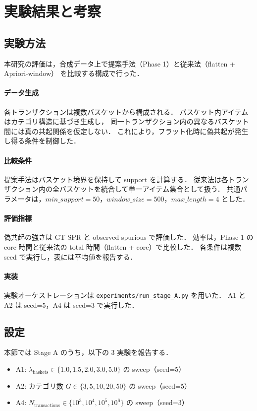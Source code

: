 \section{実験結果と考察}
\label{sec:experiments}

\subsection{実験方法}
\label{sec:exp_method}

本研究の評価は，合成データ上で提案手法（Phase 1）と従来法（flatten + Apriori-window）
を比較する構成で行った．

\paragraph{データ生成}
各トランザクションは複数バスケットから構成される．
バスケット内アイテムはカテゴリ構造に基づき生成し，
同一トランザクション内の異なるバスケット間には真の共起関係を仮定しない．
これにより，フラット化時に偽共起が発生し得る条件を制御した．

\paragraph{比較条件}
提案手法はバスケット境界を保持して support を計算する．
従来法は各トランザクション内の全バスケットを統合して単一アイテム集合として扱う．
共通パラメータは，$min\_support=50$，$window\_size=500$，$max\_length=4$ とした．

\paragraph{評価指標}
偽共起の強さは GT SPR と observed spurious で評価した．
効率は，Phase 1 の core 時間と従来法の total 時間（flatten + core）で比較した．
各条件は複数 seed で実行し，表には平均値を報告する．

\paragraph{実装}
実験オーケストレーションは \texttt{experiments/run\_stage\_A.py} を用いた．
A1 と A2 は seed=5，A4 は seed=3 で実行した．

\subsection{設定}
\label{sec:exp_setup}

本節では Stage A のうち，以下の 3 実験を報告する．
\begin{itemize}
    \item A1: $\lambda_{\text{baskets}} \in \{1.0,1.5,2.0,3.0,5.0\}$ の sweep（seed=5）
    \item A2: カテゴリ数 $G \in \{3,5,10,20,50\}$ の sweep（seed=5）
    \item A4: $N_{\text{transactions}} \in \{10^3,10^4,10^5,10^6\}$ の sweep（seed=3）
\end{itemize}

